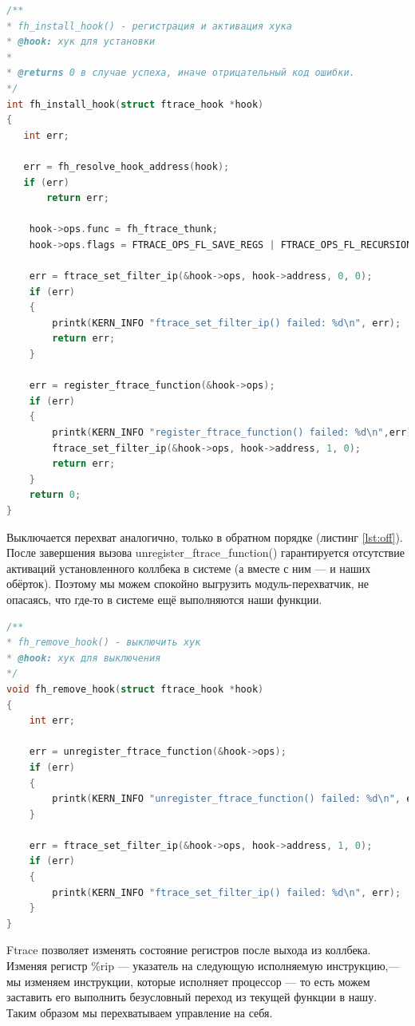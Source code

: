 \documentclass[a4paper,14pt]{article}
\begin{document}
\begin{lstlisting}[language=C++,label={lst:ops}, caption=\text{Инициализация структуры ftrace\_ops.}]
/**
* fh_install_hook() - регистрация и активация хука
* @hook: хук для установки
*
* @returns 0 в случае успеха, иначе отрицательный код ошибки.
*/
int fh_install_hook(struct ftrace_hook *hook)
{
   int err;
   
   err = fh_resolve_hook_address(hook);
   if (err)
	   return err;

    hook->ops.func = fh_ftrace_thunk;
    hook->ops.flags = FTRACE_OPS_FL_SAVE_REGS | FTRACE_OPS_FL_RECURSION_SAFE | FTRACE_OPS_FL_IPMODIFY;

    err = ftrace_set_filter_ip(&hook->ops, hook->address, 0, 0);
    if (err)
    {
	    printk(KERN_INFO "ftrace_set_filter_ip() failed: %d\n", err);
	    return err;
    }

    err = register_ftrace_function(&hook->ops);
    if (err)
    {
	    printk(KERN_INFO "register_ftrace_function() failed: %d\n",err);
	    ftrace_set_filter_ip(&hook->ops, hook->address, 1, 0);
	    return err;
    }
    return 0;
}
\end{lstlisting}

Выключается перехват аналогично, только в обратном порядке (листинг \ref{lst:off}). После завершения вызова unregister\_ftrace\_function() гарантируется отсутствие активаций установленного коллбека в системе (а вместе с ним — и наших обёрток). Поэтому мы можем спокойно выгрузить модуль-перехватчик, не опасаясь, что где-то в системе ещё выполняются наши функции.

\begin{lstlisting}[language=C++,label={lst:off}, caption=\text{Выключение перехвата.}]
/**
* fh_remove_hook() - выключить хук
* @hook: хук для выключения
*/
void fh_remove_hook(struct ftrace_hook *hook)
{
	int err;

	err = unregister_ftrace_function(&hook->ops);
	if (err)
	{
		printk(KERN_INFO "unregister_ftrace_function() failed: %d\n", err);
	}
   
	err = ftrace_set_filter_ip(&hook->ops, hook->address, 1, 0);
	if (err)
	{
		printk(KERN_INFO "ftrace_set_filter_ip() failed: %d\n", err);
    }
}
\end{lstlisting}

Ftrace позволяет изменять состояние регистров после выхода из коллбека. Изменяя регистр \%rip — указатель на следующую исполняемую инструкцию,— мы изменяем инструкции, которые исполняет процессор — то есть можем заставить его выполнить безусловный переход из текущей функции в нашу. Таким образом мы перехватываем управление на себя.
\end{document}
